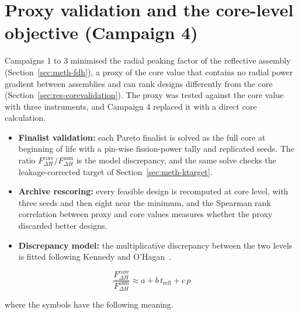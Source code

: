\section{Proxy validation and the core-level objective (Campaign 4)}
\label{sec:meth-core-objective}

Campaigns 1 to 3 minimised the radial peaking factor of the reflective
assembly (Section~\ref{sec:meth-fdh}), a proxy of the core value that
contains no radial power gradient between assemblies and can rank designs
differently from the core (Section~\ref{sec:res-corevalidation}). The
proxy was tested against the core value with three instruments, and
Campaign 4 replaced it with a direct core calculation.

\begin{itemize}
  \item \textbf{Finalist validation:} each Pareto finalist is solved as
        the full core at beginning of life with a pin-wise fission-power
        tally and replicated seeds. The ratio
        $F_{\Delta H}^\mathrm{core}/F_{\Delta H}^\mathrm{asm}$ is the
        model discrepancy, and the same solve checks the
        leakage-corrected
        target of Section~\ref{sec:meth-ktarget}.

  \item \textbf{Archive rescoring:} every feasible design is recomputed
        at core level, with three seeds and then eight near the minimum,
        and the Spearman rank correlation between proxy and core values
        measures whether the proxy discarded better designs.

  \item \textbf{Discrepancy model:} the multiplicative discrepancy
        between the two levels is fitted following Kennedy and
        O'Hagan~\cite{kennedy_ohagan_2000,forrester_book_2008}.
\end{itemize}

\begin{equation}
\frac{F_{\Delta H}^\mathrm{core}}{F_{\Delta H}^\mathrm{asm}}
\approx a + b\,t_\mathrm{refl} + c\,p
\label{eq:bridge}
\end{equation}

\noindent where the symbols have the following meaning.

